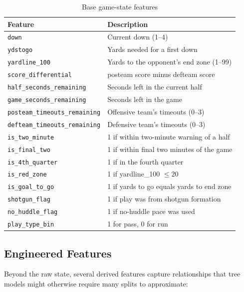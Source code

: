 \documentclass[11pt]{article}
\begin{document}
\begin{table}[H]
\centering
\caption{Base game-state features}
\begin{tabular}{lp{9cm}}
\toprule
Feature & Description \\
\midrule
\texttt{down} & Current down (1--4) \\
\texttt{ydstogo} & Yards needed for a first down \\
\texttt{yardline\_100} & Yards to the opponent's end zone (1--99) \\
\texttt{score\_differential} & posteam score minus defteam score \\
\texttt{half\_seconds\_remaining} & Seconds left in the current half \\
\texttt{game\_seconds\_remaining} & Seconds left in the game \\
\texttt{posteam\_timeouts\_remaining} & Offensive team's timeouts (0--3) \\
\texttt{defteam\_timeouts\_remaining} & Defensive team's timeouts (0--3) \\
\texttt{is\_two\_minute} & 1 if within two-minute warning of a half \\
\texttt{is\_final\_two} & 1 if within final two minutes of the game \\
\texttt{is\_4th\_quarter} & 1 if in the fourth quarter \\
\texttt{is\_red\_zone} & 1 if yardline\_100 $\leq 20$ \\
\texttt{is\_goal\_to\_go} & 1 if yards to go equals yards to end zone \\
\texttt{shotgun\_flag} & 1 if play was from shotgun formation \\
\texttt{no\_huddle\_flag} & 1 if no-huddle pace was used \\
\texttt{play\_type\_bin} & 1 for pass, 0 for run \\
\bottomrule
\end{tabular}
\end{table}

\subsection{Engineered Features}

Beyond the raw state, several derived features capture relationships that
tree models might otherwise require many splits to approximate:
\end{document}
